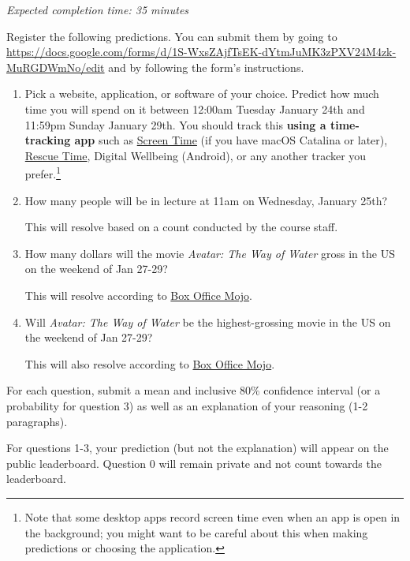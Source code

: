 \documentclass[11pt]{article}
\begin{document}
\emph{Expected completion time: 35 minutes}

Register the following predictions. You can submit them by going to 
\url{https://docs.google.com/forms/d/1S-WxsZAjfTsEK-dYtmJuMK3zPXV24M4zk-MuRGDWmNo/edit} and by following the form's instructions.

\begin{enumerate}
\item[0.] Pick a website, application, or software of your choice. Predict how much time you will spend on it between 12:00am Tuesday January 24th and 11:59pm Sunday January 29th. You should track this {\bf using a time-tracking app} such as \href{https://support.apple.com/en-us/HT210387}{Screen Time} (if you have macOS Catalina or later), \href{https://www.rescuetime.com/}{Rescue Time}, Digital Wellbeing (Android), or any another tracker you prefer.\footnote{Note that some desktop apps record screen time even when an app is open in the background; you might want to be careful about this when making predictions or choosing the application.}

\item[1.] How many people will be in lecture at 11am on Wednesday, January 25th?

      This will resolve based on a count conducted by the course staff.

\item[2.] How many dollars will the movie \emph{Avatar: The Way of Water} gross in the US on the weekend of Jan 27-29? 

      This will resolve according to \href{https://www.boxofficemojo.com/release/rl3372254721/weekend/?ref_=bo_rl_tab#tabs}{Box Office Mojo}.

  \item[3.] Will \emph{Avatar: The Way of Water} be the highest-grossing movie in the US on the weekend of Jan 27-29?

      This will also resolve according to \href{https://www.boxofficemojo.com/weekend/?ref_=bo_nb_wey_secondarytab}{Box Office Mojo}.

\end{enumerate}
 
For each question, submit a mean and inclusive 80\% confidence interval (or a probability for question 3) 
as well as an explanation of your reasoning (1-2 paragraphs).

For questions 1-3, your prediction (but not the explanation) will appear on the public leaderboard. 
Question 0 will remain private and not count towards the leaderboard.
\end{document}

